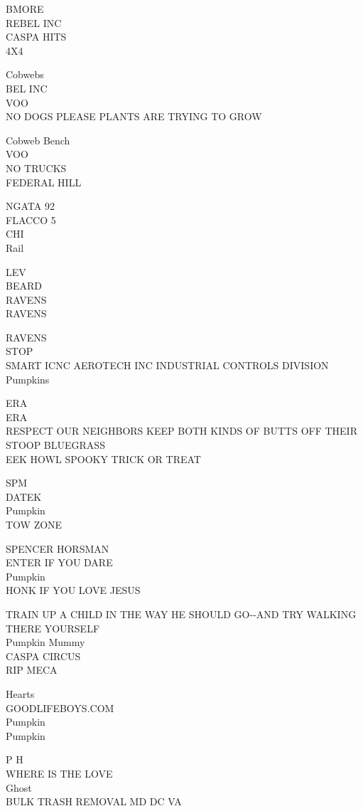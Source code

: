 \documentclass[10pt,letterpaper]{article}
\begin{document}
BMORE\\
REBEL INC\\
CASPA HITS\\
4X4

Cobwebs\\
BEL INC\\
VOO\\
NO DOGS PLEASE PLANTS ARE TRYING TO GROW

Cobweb Bench\\
VOO\\
NO TRUCKS\\
FEDERAL HILL

NGATA 92\\
FLACCO 5\\
CHI\\
Rail

LEV\\
BEARD\\
RAVENS\\
RAVENS

RAVENS\\
STOP\\
SMART ICNC AEROTECH INC INDUSTRIAL CONTROLS DIVISION\\
Pumpkins

ERA\\
ERA\\
RESPECT OUR NEIGHBORS KEEP BOTH KINDS OF BUTTS OFF THEIR STOOP BLUEGRASS\\
EEK HOWL SPOOKY TRICK OR TREAT

SPM\\
DATEK\\
Pumpkin\\
TOW ZONE

SPENCER HORSMAN\\
ENTER IF YOU DARE\\
Pumpkin\\
HONK IF YOU LOVE JESUS

TRAIN UP A CHILD IN THE WAY HE SHOULD GO{-}{-}AND TRY WALKING THERE YOURSELF\\
Pumpkin Mummy\\
CASPA CIRCUS\\
RIP MECA

Hearts\\
GOODLIFEBOYS.COM\\
Pumpkin\\
Pumpkin

P H\\
WHERE IS THE LOVE\\
Ghost\\
BULK TRASH REMOVAL MD DC VA
\end{document}
